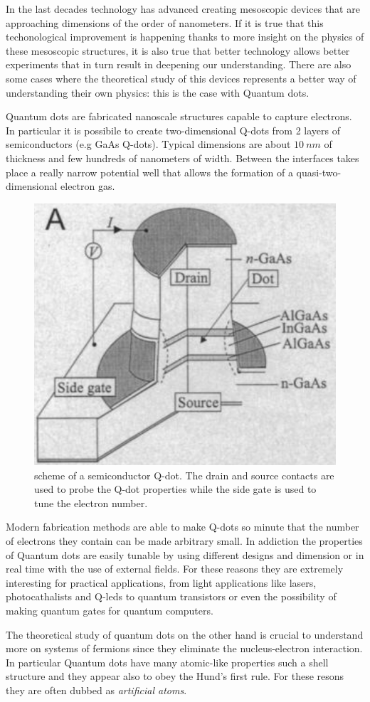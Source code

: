 In the last decades technology has advanced creating mesoscopic devices that are approaching dimensions of the order of nanometers.
If it is true that this techonological improvement is happening thanks to more insight on the physics of these mesoscopic structures, it is also true that better technology allows better experiments that in turn result in deepening our understanding.
There are also some cases where the theoretical study of this devices represents a better way of understanding their own physics: this is the case with Quantum dots.

Quantum dots are fabricated nanoscale structures capable to capture electrons.
In particular it is possibile to create  two-dimensional Q-dots from 2 layers of semiconductors (e.g GaAs Q-dots).
Typical dimensions are about $\SI{10}{nm}$ of thickness and few hundreds of nanometers of width.
Between the interfaces takes place a really narrow potential well that allows the formation of a quasi-two-dimensional electron gas.

\begin{figure}[H]
  \centering
  \includegraphics[width=.3\textwidth]{Images/qdotscheme1.png}
  \caption[scheme of a semiconductor Q-dot.]{scheme of a semiconductor Q-dot. The drain and source contacts are used to probe the Q-dot properties while the side gate is used to tune the electron number\cite{Kouwenhoven1997}.}
  \label{Qdotscheme}
\end{figure}

Modern fabrication methods are able to make Q-dots so minute that the number of electrons they contain can be made arbitrary small.
In addiction the properties of Quantum dots are easily tunable by using different designs and dimension or in real time with the use of external fields.
For these reasons they are extremely interesting for practical applications, from light applications like lasers, photocathalists and Q-leds to quantum transistors or even the possibility of making quantum gates for quantum computers\cite{SiljamakiPhD,Kouwenhoven1997}.

The theoretical study of quantum dots on the other hand is crucial to understand more on systems of fermions since they eliminate the nucleus-electron interaction.
In particular Quantum dots have many atomic-like properties such a shell structure and they appear also to obey the Hund's first rule\cite{Pederiva2000,Harju1999,Tarucha1996,Kouwenhoven1997,Colletti2002}.
For these resons they are often dubbed as \textit{artificial atoms}.

